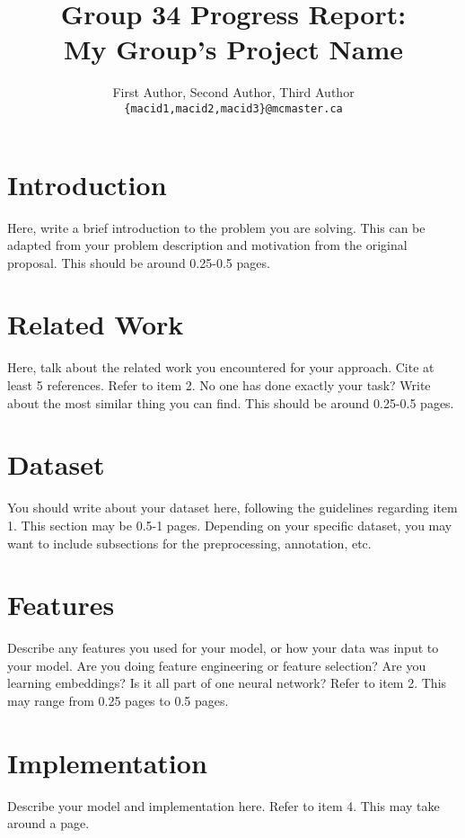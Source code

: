 \documentclass[11pt]{article}
\title{Group 34 Progress Report:\\My Group's Project Name}
\author{First Author, Second Author, Third Author \\
  \texttt{\{macid1,macid2,macid3\}@mcmaster.ca} }
\begin{document}
\maketitle

\section{Introduction}

Here, write a brief introduction to the problem you are solving. This can be adapted from your problem description and motivation from the original proposal. This should be around 0.25-0.5 pages.

\section{Related Work}

Here, talk about the related work you encountered for your approach. Cite at least 5 references. Refer to item 2. No one has done exactly your task? Write about the most similar thing you can find. This should be around 0.25-0.5 pages.

\section{Dataset}

You should write about your dataset here, following the guidelines regarding item 1. This section may be 0.5-1 pages. Depending on your specific dataset, you may want to include subsections for the preprocessing, annotation, etc.

\section{Features}

Describe any features you used for your model, or how your data was input to your model. Are you doing feature engineering or feature selection? Are you learning embeddings? Is it all part of one neural network? Refer to item 2. This may range from 0.25 pages to 0.5 pages.

\section{Implementation}

Describe your model and implementation here. Refer to item 4. This may take around a page.
\end{document}
